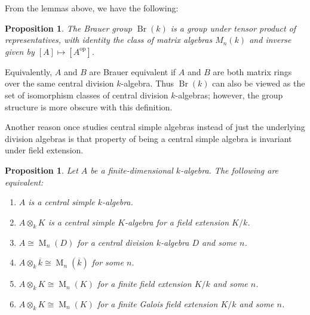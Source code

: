 \documentclass[12pt]{article}
\theoremstyle{plain}
\newtheorem{proposition}[theorem]{Proposition}
\theoremstyle{definition}
\theoremstyle{remark}
\numberwithin{equation}{section}
\begin{document}
From the lemmas above, we have the following:

\begin{proposition}
The Brauer group $\operatorname{Br}(k)$ is a group under
tensor product of representatives,
with identity the class of matrix algebras $M_n(k)$
and inverse given by $[A] \mapsto [A^{\mathrm{op}}]$.
\end{proposition}

Equivalently, $A$ and $B$ are Brauer equivalent if $A$ and $B$ are both
matrix rings over the same central division $k$-algebra.
Thus $\operatorname{Br}(k)$ can also be viewed as the set of isomorphism
classes of central division $k$-algebras; however, the group structure
is more obscure with this definition.

Another reason once studies central simple algebras instead of just the
underlying division algebras is that property of being a central simple
algebra is invariant under field extension.

\begin{proposition}
Let $A$ be a finite-dimensional $k$-algebra.
The following are equivalent:
\begin{enumerate}
\item[(a)] $A$ is a central simple $k$-algebra.
\item[(b)] $A \otimes_k K$ is a central simple $K$-algebra for a field
extension $K/k$.
\item[(c)] $A \cong \operatorname{M}_n(D)$ for a central division $k$-algebra
$D$ and some $n$.
\item[(d)] $A \otimes_k \overline{k} \cong \operatorname{M}_n(\overline{k})$
for some $n$.
\item[(e)] $A \otimes_k K \cong \operatorname{M}_n(K)$
for a finite field extension $K/k$ and some $n$.
\item[(f)] $A \otimes_k K \cong \operatorname{M}_n(K)$
for a finite Galois field extension $K/k$ and some $n$.
\end{enumerate}
\end{proposition}
\end{document}

